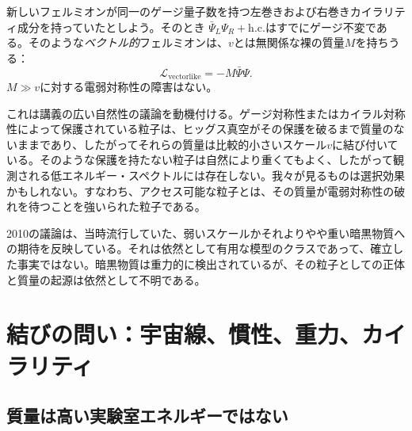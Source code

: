 新しいフェルミオンが同一のゲージ量子数を持つ左巻きおよび右巻きカイラリティ成分を持っていたとしよう。そのとき
\(\bar\Psi_L\Psi_R+\mathrm{h.c.}\)はすでにゲージ不変である。そのような\emph{ベクトル的}フェルミオンは、\(v\)とは無関係な裸の質量\(M\)を持ちうる：
\begin{equation}
  \mathcal L_{\mathrm{vectorlike}}
  =-M\bar\Psi\Psi.
  \label{eq:l09-vectorlike-mass}
\end{equation}
\(M\gg v\)に対する電弱対称性の障害はない。

これは講義の広い自然性の議論を動機付ける。ゲージ対称性またはカイラル対称性によって保護されている粒子は、ヒッグス真空がその保護を破るまで質量のないままであり、したがってそれらの質量は比較的小さいスケール\(v\)に結び付いている。そのような保護を持たない粒子は自然により重くてもよく、したがって観測される低エネルギー・スペクトルには存在しない。我々が見るものは選択効果かもしれない。すなわち、アクセス可能な粒子とは、その質量が電弱対称性の破れを待つことを強いられた粒子である。

\begin{classroomqa}
\end{classroomqa}

2010の議論は、当時流行していた、弱いスケールかそれよりやや重い暗黒物質への期待を反映している。それは依然として有用な模型のクラスであって、確立した事実ではない。暗黒物質は重力的に検出されているが、その粒子としての正体と質量の起源は依然として不明である。

\section{結びの問い：宇宙線、慣性、重力、カイラリティ}

\subsection{質量は高い実験室エネルギーではない}

\begin{classroomqa}
\end{classroomqa}

